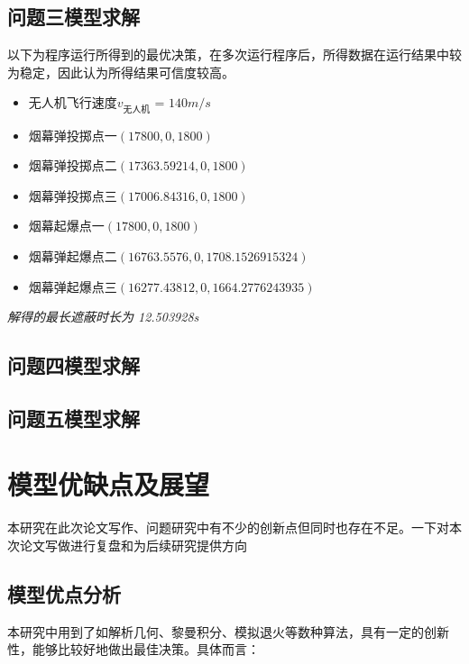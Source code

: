 \documentclass{article}
\begin{document}
\subsection{问题三模型求解}
以下为程序运行所得到的最优决策，在多次运行程序后，所得数据在运行结果中较为稳定，因此认为所得结果可信度较高。

\begin{itemize}
    \item 无人机飞行速度$v_\text{无人机}$ = $140 m/s$
    \item 烟幕弹投掷点一$(17800,0,1800)$
    \item 烟幕弹投掷点二$(17363.59214,0,1800)$
    \item 烟幕弹投掷点三$(17006.84316,0,1800)$
    \item 烟幕起爆点一$(17800,0,1800)$
    \item 烟幕弹起爆点二$(16763.5576,0,1708.1526915324)$
    \item 烟幕弹起爆点三$(16277.43812,0,1664.2776243935)$
\end{itemize}

\textit{解得的最长遮蔽时长为 12.503928s}

\subsection{问题四模型求解}

\subsection{问题五模型求解}

\section{模型优缺点及展望}
本研究在此次论文写作、问题研究中有不少的创新点但同时也存在不足。一下对本次论文写做进行复盘和为后续研究提供方向

\subsection{模型优点分析}

本研究中用到了如解析几何、黎曼积分、模拟退火等数种算法，具有一定的创新性，能够比较好地做出最佳决策。具体而言：
\end{document}
